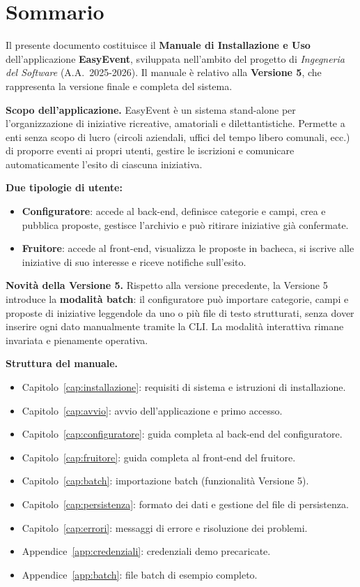 \documentclass[12pt,a4paper,oneside]{report}
\begin{document}
\chapter*{Sommario}

Il presente documento costituisce il \textbf{Manuale di Installazione e Uso} dell'applicazione \textbf{EasyEvent}, sviluppata nell'ambito del progetto di \textit{Ingegneria del Software} (A.A.\ 2025-2026). Il manuale è relativo alla \textbf{Versione 5}, che rappresenta la versione finale e completa del sistema.

\bigskip
\textbf{Scopo dell'applicazione.} EasyEvent è un sistema stand-alone per l'organizzazione di iniziative ricreative, amatoriali e dilettantistiche. Permette a enti senza scopo di lucro (circoli aziendali, uffici del tempo libero comunali, ecc.) di proporre eventi ai propri utenti, gestire le iscrizioni e comunicare automaticamente l'esito di ciascuna iniziativa.

\bigskip
\textbf{Due tipologie di utente:}
\begin{itemize}
  \item \textbf{Configuratore}: accede al back-end, definisce categorie e campi, crea e pubblica proposte, gestisce l'archivio e può ritirare iniziative già confermate.
  \item \textbf{Fruitore}: accede al front-end, visualizza le proposte in bacheca, si iscrive alle iniziative di suo interesse e riceve notifiche sull'esito.
\end{itemize}

\bigskip
\textbf{Novità della Versione 5.} Rispetto alla versione precedente, la Versione 5 introduce la \textbf{modalità batch}: il configuratore può importare categorie, campi e proposte di iniziative leggendole da uno o più file di testo strutturati, senza dover inserire ogni dato manualmente tramite la CLI. La modalità interattiva rimane invariata e pienamente operativa.

\bigskip
\textbf{Struttura del manuale.}
\begin{itemize}
  \item Capitolo~\ref{cap:installazione}: requisiti di sistema e istruzioni di installazione.
  \item Capitolo~\ref{cap:avvio}: avvio dell'applicazione e primo accesso.
  \item Capitolo~\ref{cap:configuratore}: guida completa al back-end del configuratore.
  \item Capitolo~\ref{cap:fruitore}: guida completa al front-end del fruitore.
  \item Capitolo~\ref{cap:batch}: importazione batch (funzionalità Versione 5).
  \item Capitolo~\ref{cap:persistenza}: formato dei dati e gestione del file di persistenza.
  \item Capitolo~\ref{cap:errori}: messaggi di errore e risoluzione dei problemi.
  \item Appendice~\ref{app:credenziali}: credenziali demo precaricate.
  \item Appendice~\ref{app:batch}: file batch di esempio completo.
\end{itemize}
\end{document}
